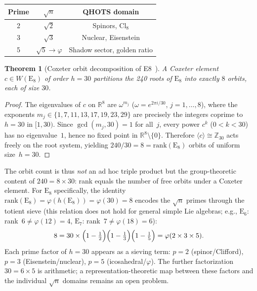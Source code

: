 \documentclass[aps,prd,twocolumn,superscriptaddress,floatfix,nofootinbib]{revtex4-2}
\newtheorem{theorem}{Theorem}
\theoremstyle{definition}
\theoremstyle{remark}
\newcommand{\vp}{\varphi}
\begin{document}
\begin{center}
\begin{tabular}{ccc}
\toprule
Prime & $\sqrt{n}$ & QHOTS domain \\
\midrule
2 & $\sqrt{2}$ & Spinors, Cl$_8$ \\
3 & $\sqrt{3}$ & Nuclear, Eisenstein \\
5 & $\sqrt{5} \to \vp$ & Shadow sector, golden ratio \\
\bottomrule
\end{tabular}
\end{center}

\begin{theorem}[Coxeter orbit decomposition of E8~\cite{humphreys}]
\label{thm:coxeter-orbit}
A Coxeter element $c \in W(\mathrm{E}_8)$ of order $h = 30$ partitions the
240 roots of\/ $\mathrm{E}_8$ into exactly $8$ orbits, each of size $30$.
\end{theorem}

\begin{proof}
The eigenvalues of $c$ on $\mathbb{R}^8$ are $\omega^{m_j}$
($\omega = e^{2\pi i/30}$, $j = 1,\ldots,8$), where the exponents
$m_j \in \{1,7,11,13,17,19,23,29\}$ are precisely the integers coprime
to $h = 30$ in $[1,30)$.  Since $\gcd(m_j, 30) = 1$ for all~$j$,
every power $c^k$ ($0 < k < 30$) has no eigenvalue~$1$, hence no fixed
point in $\mathbb{R}^8 \setminus \{0\}$.  Therefore $\langle c \rangle
\cong \mathbb{Z}_{30}$ acts freely on the root system, yielding
$240/30 = 8 = \mathrm{rank}(\mathrm{E}_8)$ orbits of uniform
size~$h = 30$.
\end{proof}

\noindent
The orbit count is thus \emph{not} an ad hoc triple product but the
group-theoretic content of $240 = 8 \times 30$: rank equals the number
of free orbits under a Coxeter element.  For $\mathrm{E}_8$ specifically, the identity
$\mathrm{rank}(\mathrm{E}_8) = \varphi(h(\mathrm{E}_8)) = \varphi(30) = 8$ encodes
the $\sqrt{n}$ primes through the totient sieve (this relation does not hold for
general simple Lie algebras; e.g., $\mathrm{E}_6$: rank~$6 \neq \varphi(12)=4$,
$\mathrm{E}_7$: rank~$7 \neq \varphi(18)=6$):
\begin{equation}
\label{eq:totient-rank}
    8 = 30 \times \Bigl(1 - \tfrac{1}{2}\Bigr)
         \Bigl(1 - \tfrac{1}{3}\Bigr)
         \Bigl(1 - \tfrac{1}{5}\Bigr)
    = \varphi(2 \times 3 \times 5).
\end{equation}
Each prime factor of $h = 30$ appears as a sieving term: $p = 2$
(spinor/Clifford), $p = 3$ (Eisenstein/nuclear), $p = 5$
(icosahedral/$\varphi$).  The further factorization $30 = 6 \times 5$ is
arithmetic; a representation-theoretic map between these factors and the
individual $\sqrt{n}$ domains remains an open problem.
\end{document}
